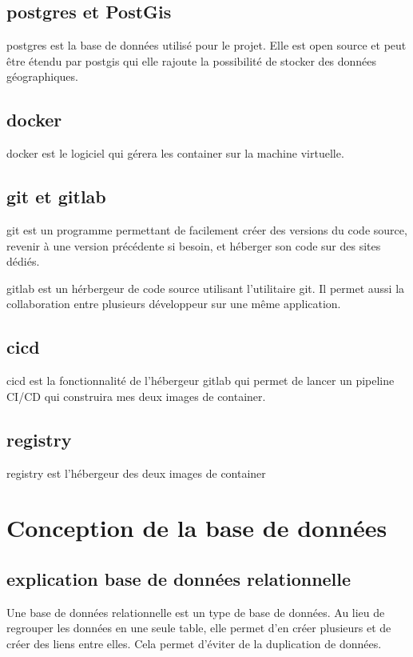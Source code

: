 \documentclass[
    iai, %
    il, %
]{heig-tb}
\begin{document}
\subsection{\gls{postgres} et PostGis}
\gls{postgres} est la base de données utilisé pour le projet.
Elle est open source et peut être étendu par \gls{postgis} qui elle rajoute la possibilité de stocker des données géographiques.

\subsection{\gls{docker}}
\gls{docker} est le logiciel qui gérera les container sur la machine virtuelle.


\subsection{\gls{git} et \gls{gitlab}}
\gls{git} est un programme permettant de facilement créer des versions du code source, revenir à une version précédente si besoin, et héberger son code sur des sites dédiés.

\gls{gitlab} est un hérbergeur de code source utilisant l'utilitaire \gls{git}.
Il permet aussi la collaboration entre plusieurs développeur sur une même application.

\subsection{\gls{cicd}}
\gls{cicd} est la fonctionnalité de l'hébergeur \gls{gitlab}
qui permet de lancer un pipeline CI/CD qui construira mes deux images de container.

\subsection{\gls{registry}}
\gls{registry} est l'hébergeur des deux images de container


\section{Conception de la base de données}

\subsection{explication base de données relationnelle}
Une base de données relationnelle est un type de base de données.
Au lieu de regrouper les données en une seule table,
elle permet d'en créer plusieurs et de créer des liens entre elles.
Cela permet d'éviter de la duplication de données.
\end{document}
